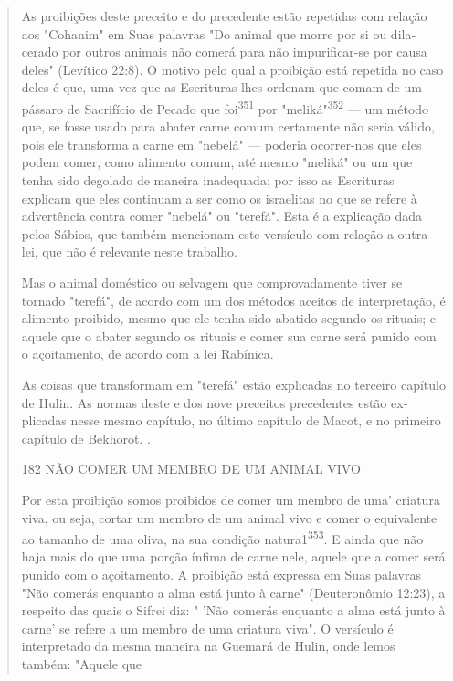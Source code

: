 \begin{quote}
As proibições deste preceito e do precedente estão repetidas com relação
aos "Cohanim" em Suas palavras "Do animal que morre por si ou
dila­cerado por outros animais não comerá para não impurificar-se por
causa de­les" (Levítico 22:8). O motivo pelo qual a proibição está
repetida no caso deles é que, uma vez que as Escrituras lhes ordenam que
comam de um pássaro de Sacrifício de Pecado que foi\textsuperscript{351}
por "meliká"\textsuperscript{352} --- um método que, se fosse usado para
abater carne comum certamente não seria válido, pois ele transfor­ma a
carne em "nebelá" --- poderia ocorrer-nos que eles podem comer, como
alimento comum, até mesmo "meliká" ou um que tenha sido degolado de
ma­neira inadequada; por isso as Escrituras explicam que eles continuam
a ser co­mo os israelitas no que se refere à advertência contra comer
"nebelá" ou "tere­fá". Esta é a explicação dada pelos Sábios, que também
mencionam este versí­culo com relação a outra lei, que não é relevante
neste trabalho.

Mas o animal doméstico ou selvagem que comprovadamente tiver se tornado
"terefá", de acordo com um dos métodos aceitos de interpretação, é
alimento proibido, mesmo que ele tenha sido abatido segundo os rituais;
e aquele que o abater segundo os rituais e comer sua carne será punido
com o açoitamento, de acordo com a lei Rabínica.

As coisas que transformam em "terefá" estão explicadas no terceiro
capítulo de Hulin. As normas deste e dos nove preceitos precedentes
estão ex­plicadas nesse mesmo capítulo, no último capítulo de Macot, e
no primeiro ca­pítulo de Bekhorot. .

182 NÃO COMER UM MEMBRO DE UM ANIMAL VIVO

Por esta proibição somos proibidos de comer um membro de uma' criatura
viva, ou seja, cortar um membro de um animal vivo e comer o equi­valente
ao tamanho de uma oliva, na sua condição natura1\textsuperscript{353}. E
ainda que não haja mais do que uma porção ínfima de carne nele, aquele
que a comer será punido com o açoitamento. A proibição está expressa em
Suas palavras "Não comerás enquanto a alma está junto à carne"
(Deuteronômio 12:23), a respei­to das quais o Sifrei diz: " 'Não comerás
enquanto a alma está junto à carne' se refere a um membro de uma
criatura viva". O versículo é interpretado da mesma maneira na Guemará
de Hulin, onde lemos também: "Aquele que
\end{quote}


